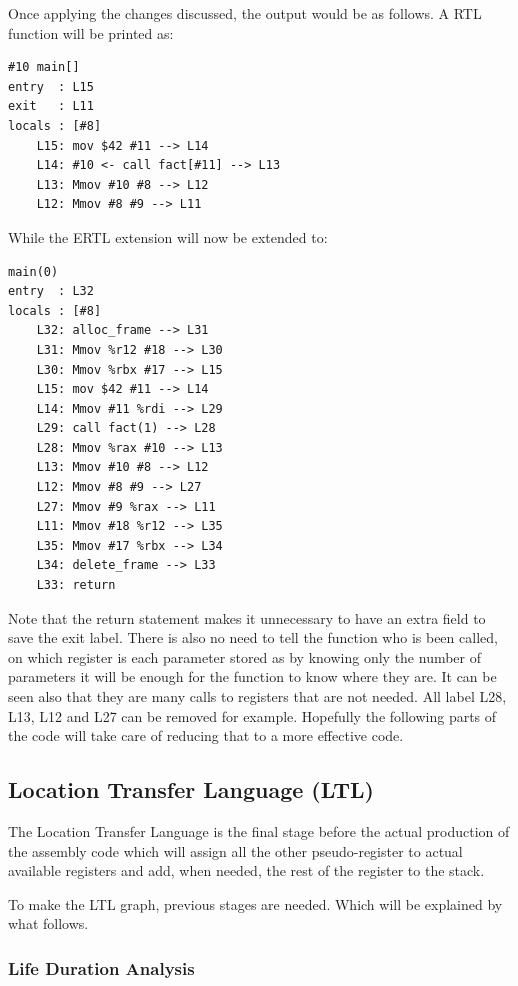 \documentclass[conference]{IEEEtran}
\theoremstyle{definition}
\begin{document}
Once applying the changes discussed, the output would be as follows. A RTL function will be printed as:

\begin{lstlisting}
#10 main[]
entry  : L15
exit   : L11
locals : [#8]
	L15: mov $42 #11 --> L14
	L14: #10 <- call fact[#11] --> L13
	L13: Mmov #10 #8 --> L12
	L12: Mmov #8 #9 --> L11
\end{lstlisting}

While the ERTL extension will now be extended to:

\begin{lstlisting}
main(0)
entry  : L32
locals : [#8]
	L32: alloc_frame --> L31 
	L31: Mmov %r12 #18 --> L30 
	L30: Mmov %rbx #17 --> L15
	L15: mov $42 #11 --> L14
	L14: Mmov #11 %rdi --> L29
	L29: call fact(1) --> L28 
	L28: Mmov %rax #10 --> L13 
	L13: Mmov #10 #8 --> L12 
	L12: Mmov #8 #9 --> L27 
	L27: Mmov #9 %rax --> L11 
	L11: Mmov #18 %r12 --> L35 
	L35: Mmov #17 %rbx --> L34
	L34: delete_frame --> L33 
	L33: return
\end{lstlisting}

Note that the return statement makes it unnecessary to have an extra field to save the exit label. There is also no need to tell the function who is been called, on which register is each parameter stored as by knowing only the number of parameters it will be enough for the function to know where they are. It can be seen also that they are many calls to registers that are not needed. All label L28, L13, L12 and L27 can be removed for example. Hopefully the following parts of the code will take care of reducing that to a more effective code.

\subsection{Location Transfer Language (LTL)}

The Location Transfer Language is the final stage before the actual production of the assembly code which will assign all the other pseudo-register to actual available registers and add, when needed, the rest of the register to the stack.

To make the LTL graph, previous stages are needed. Which will be explained by what follows.

\subsubsection{Life Duration Analysis}
\end{document}
